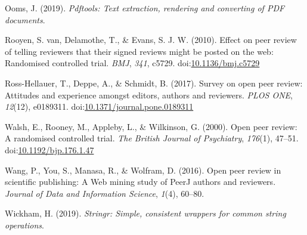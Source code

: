 \documentclass[,jou, a4paper,floatsintext]{apa6}
\begin{document}
\leavevmode\hypertarget{ref-ooms_pdftools_2019}{}%
Ooms, J. (2019). \emph{Pdftools: Text extraction, rendering and converting of PDF documents}.

\leavevmode\hypertarget{ref-rooyen_effect_2010}{}%
Rooyen, S. van, Delamothe, T., \& Evans, S. J. W. (2010). Effect on peer review of telling reviewers that their signed reviews might be posted on the web: Randomised controlled trial. \emph{BMJ}, \emph{341}, c5729. doi:\href{https://doi.org/10.1136/bmj.c5729}{10.1136/bmj.c5729}

\leavevmode\hypertarget{ref-ross-hellauer_survey_2017}{}%
Ross-Hellauer, T., Deppe, A., \& Schmidt, B. (2017). Survey on open peer review: Attitudes and experience amongst editors, authors and reviewers. \emph{PLOS ONE}, \emph{12}(12), e0189311. doi:\href{https://doi.org/10.1371/journal.pone.0189311}{10.1371/journal.pone.0189311}

\leavevmode\hypertarget{ref-walsh_open_2000}{}%
Walsh, E., Rooney, M., Appleby, L., \& Wilkinson, G. (2000). Open peer review: A randomised controlled trial. \emph{The British Journal of Psychiatry}, \emph{176}(1), 47--51. doi:\href{https://doi.org/10.1192/bjp.176.1.47}{10.1192/bjp.176.1.47}

\leavevmode\hypertarget{ref-wang_open_2016}{}%
Wang, P., You, S., Manasa, R., \& Wolfram, D. (2016). Open peer review in scientific publishing: A Web mining study of PeerJ authors and reviewers. \emph{Journal of Data and Information Science}, \emph{1}(4), 60--80.

\leavevmode\hypertarget{ref-wickham_stringr_2019}{}%
Wickham, H. (2019). \emph{Stringr: Simple, consistent wrappers for common string operations}.
\end{document}

